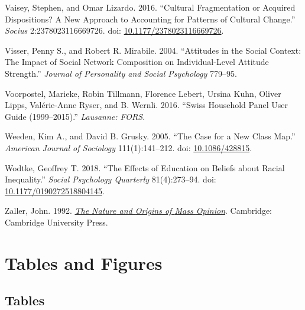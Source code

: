 \documentclass[
  12pt,
]{article}
\newlength{\cslhangindent}
\newlength{\cslentryspacingunit} %
\newenvironment{CSLReferences}[2] %
 {%
  \setlength{\parindent}{0pt}
  \ifodd #1
  \let\oldpar\par
  \def\par{\hangindent=\cslhangindent\oldpar}
  \fi
  \setlength{\parskip}{#2\cslentryspacingunit}
 }%
 {}
\begin{document}
\begin{CSLReferences}{1}{0}
\leavevmode{}%
Vaisey, Stephen, and Omar Lizardo. 2016. {``Cultural {Fragmentation} or
{Acquired} {Dispositions}? {A} {New} {Approach} to {Accounting} for
{Patterns} of {Cultural} {Change}.''} \emph{Socius} 2:2378023116669726.
doi:
\href{https://doi.org/10.1177/2378023116669726}{10.1177/2378023116669726}.

\leavevmode{}%
Visser, Penny S., and Robert R. Mirabile. 2004. {``Attitudes in the
Social Context: {The} Impact of Social Network Composition on
Individual-Level Attitude Strength.''} \emph{Journal of Personality and
Social Psychology} 779--95.

\leavevmode{}%
Voorpostel, Marieke, Robin Tillmann, Florence Lebert, Ursina Kuhn,
Oliver Lipps, Valérie-Anne Ryser, and B. Wernli. 2016. {``Swiss
Household Panel User Guide (1999--2015).''} \emph{Lausanne: FORS}.

\leavevmode{}%
Weeden, Kim A., and David B. Grusky. 2005. {``The {Case} for a {New}
{Class} {Map}.''} \emph{American Journal of Sociology} 111(1):141--212.
doi: \href{https://doi.org/10.1086/428815}{10.1086/428815}.

\leavevmode{}%
Wodtke, Geoffrey T. 2018. {``The {Effects} of {Education} on {Beliefs}
about {Racial} {Inequality}.''} \emph{Social Psychology Quarterly}
81(4):273--94. doi:
\href{https://doi.org/10.1177/0190272518804145}{10.1177/0190272518804145}.

\leavevmode{}%
Zaller, John. 1992.
\emph{\href{https://doi.org/10.1017/CBO9780511818691}{The {Nature} and
{Origins} of {Mass} {Opinion}}}. Cambridge: Cambridge University Press.

\end{CSLReferences}

\newpage

\hypertarget{tables-and-figures}{%
\section{Tables and Figures}\label{tables-and-figures}}

\hypertarget{tables}{%
\subsection{Tables}\label{tables}}
\end{document}
